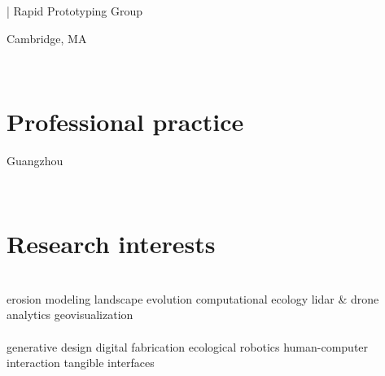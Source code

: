 \documentclass[]{baharmon-cv}
\renewcommand{\baselinestretch}{1.15}
\begin{document}
\begin{minipage}[t]{0.85\textwidth} 
\renewcommand{\baselinestretch}{1.75}
  | Rapid Prototyping Group
\end{minipage}
\begin{minipage}[t]{0.15\textwidth} 
Cambridge, MA
\end{minipage}\\

\sectiondivider


\section{Professional practice}
\begin{minipage}[t]{0.85\textwidth} 
\end{minipage}
\begin{minipage}[t]{0.15\textwidth} 
Guangzhou%
\end{minipage}\\

\clearpage


\section{Research interests}

\vspace*{0.3cm}
 \\ \vspace*{0.1cm}
\normalsize{
erosion modeling
\textbullet{}
landscape evolution
\textbullet{}
computational ecology 
\textbullet{}
lidar \& drone analytics
\textbullet{}
geovisualization
}
\\

 \vspace{0.1em} \\ \vspace*{0.1cm}
\normalsize{
generative design
\textbullet{}
digital fabrication
\textbullet{}
ecological robotics
\textbullet{}
human-computer interaction
\textbullet{}
tangible interfaces
}
\\
\end{document}

